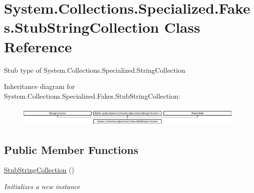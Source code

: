 \hypertarget{class_system_1_1_collections_1_1_specialized_1_1_fakes_1_1_stub_string_collection}{\section{System.\-Collections.\-Specialized.\-Fakes.\-Stub\-String\-Collection Class Reference}
\label{class_system_1_1_collections_1_1_specialized_1_1_fakes_1_1_stub_string_collection}
}


Stub type of System.\-Collections.\-Specialized.\-String\-Collection 


Inheritance diagram for System.\-Collections.\-Specialized.\-Fakes.\-Stub\-String\-Collection\-:\begin{figure}[H]
\begin{center}
\leavevmode
\includegraphics[height=0.987654cm]{class_system_1_1_collections_1_1_specialized_1_1_fakes_1_1_stub_string_collection}
\end{center}
\end{figure}
\subsection*{Public Member Functions}
\begin{DoxyCompactItemize}
\item 
\hyperlink{class_system_1_1_collections_1_1_specialized_1_1_fakes_1_1_stub_string_collection_af5eecb8fb3f0c437bacf47c30998f9d2}{Stub\-String\-Collection} ()
\begin{DoxyCompactList}\small\item\em Initializes a new instance\end{DoxyCompactList}\end{DoxyCompactItemize}
